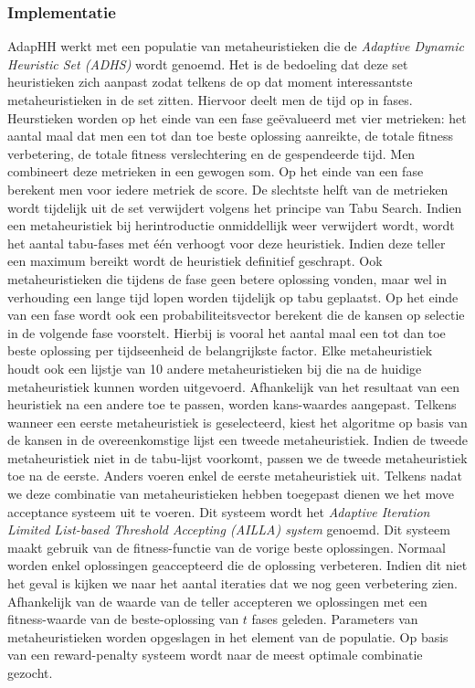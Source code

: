 \subsubsection{Implementatie}
AdapHH\cite{chesc-adaphh,conf/lion/MisirVCB12} werkt met een populatie van metaheuristieken die de \emph{Adaptive Dynamic Heuristic Set (ADHS)} wordt genoemd. Het is de bedoeling dat deze set heuristieken zich aanpast zodat telkens de op dat moment interessantste metaheuristieken in de set zitten. Hiervoor deelt men de tijd op in fases. Heurstieken worden op het einde van een fase ge\"evalueerd met vier metrieken: het aantal maal dat men een tot dan toe beste oplossing aanreikte, de totale fitness verbetering, de totale fitness verslechtering en de gespendeerde tijd. Men combineert deze metrieken in een gewogen som. Op het einde van een fase berekent men voor iedere metriek de score. De slechtste helft van de metrieken wordt tijdelijk uit de set verwijdert volgens het principe van Tabu Search. Indien een metaheuristiek bij herintroductie onmiddellijk weer verwijdert wordt, wordt het aantal tabu-fases met \'e\'en verhoogt voor deze heuristiek. Indien deze teller een maximum bereikt 
wordt de heuristiek definitief geschrapt. Ook metaheuristieken die tijdens de fase geen betere oplossing vonden, maar wel in verhouding een lange tijd lopen worden tijdelijk op tabu geplaatst. Op het einde van een fase wordt ook een probabiliteitsvector berekent die de kansen op selectie in de volgende fase voorstelt. Hierbij is vooral het aantal maal een tot dan toe beste oplossing per tijdseenheid de belangrijkste factor. Elke metaheuristiek houdt ook een lijstje van 10 andere metaheuristieken bij die na de huidige metaheuristiek kunnen worden uitgevoerd. Afhankelijk van het resultaat van een heuristiek na een andere toe te passen, worden kans-waardes aangepast. Telkens wanneer een eerste metaheuristiek is geselecteerd, kiest het algoritme op basis van de kansen in de overeenkomstige lijst een tweede metaheuristiek. Indien de tweede metaheuristiek niet in de tabu-lijst voorkomt, passen we de tweede metaheuristiek toe na de eerste. Anders voeren enkel de eerste metaheuristiek uit. Telkens nadat we deze 
combinatie van metaheuristieken hebben toegepast dienen we het move acceptance systeem uit te voeren. Dit systeem wordt het \emph{Adaptive Iteration Limited List-based Threshold Accepting (AILLA) system} genoemd. Dit systeem maakt gebruik van de fitness-functie van de vorige beste oplossingen. Normaal worden enkel oplossingen geaccepteerd die de oplossing verbeteren. Indien dit niet het geval is kijken we naar het aantal iteraties dat we nog geen verbetering zien. Afhankelijk van de waarde van de teller accepteren we oplossingen met een fitness-waarde van de beste-oplossing van $t$ fases geleden. Parameters van metaheuristieken worden opgeslagen in het element van de populatie. Op basis van een reward-penalty systeem wordt naar de meest optimale combinatie gezocht.


